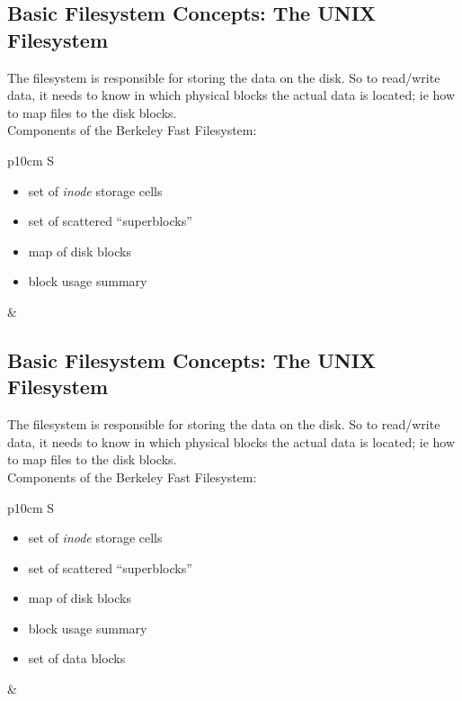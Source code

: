 \documentclass[xga]{xdvislides}
\begin{document}
\subsection{Basic Filesystem Concepts: The UNIX Filesystem}
The filesystem is responsible for storing the data on the disk.
So to read/write data, it needs to know in which physical blocks the actual
data is located; ie how to map files to the disk blocks.
\\

Components of the Berkeley Fast Filesystem:
\\

\begin{tabular}{ p{10cm} S }
\begin{itemize}
	\item set of {\em inode} storage cells
	\item set of scattered ``superblocks''
	\item map of disk blocks
	\item block usage summary
\end{itemize}
&  \\
\end{tabular}

\subsection{Basic Filesystem Concepts: The UNIX Filesystem}
The filesystem is responsible for storing the data on the disk.
So to read/write data, it needs to know in which physical blocks the actual
data is located; ie how to map files to the disk blocks.
\\

Components of the Berkeley Fast Filesystem:
\\

\begin{tabular}{ p{10cm} S }
\begin{itemize}
	\item set of {\em inode} storage cells
	\item set of scattered ``superblocks''
	\item map of disk blocks
	\item block usage summary
	\item set of data blocks
\end{itemize}
&  \\
\end{tabular}
\end{document}
